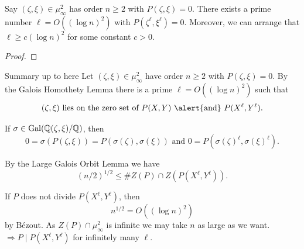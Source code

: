 \documentclass{beamer}
\begin{document}
\begin{frame}
  \begin{lemma}
    Say $(\zeta,\xi)\in \mu_\infty^2$ has order $n\ge 2$
    with $P(\zeta,\xi)=0$. There exists a prime number $\ell=O((\log
    n)^2)$ with $P(\zeta^\ell,\xi^\ell)=0$.
    Moreover, we can arrange that $\ell \ge c (\log n)^2$ for some
    constant $c>0$. 
  \end{lemma}
  \begin{proof}
    \vspace{4.5cm}

  \end{proof}
\end{frame}

\begin{frame}{Summary up to here}
  Let $(\zeta,\xi)\in \mu_\infty^2$ have order $n\ge 2$ with
  $P(\zeta,\xi)=0$. By the \alert{Galois Homothety Lemma} there
  is a prime  $\ell = O((\log n)^2)$ such that
  \begin{equation}
    (\zeta,\xi)\text{ lies on the zero set of $P(X,Y)$ \alert{and} 
      $P(X^{\ell},Y^{\ell})$}.
  \end{equation}

  If $\sigma\in \mathrm{Gal}({\mathbb{Q}}(\zeta,\xi)/{\mathbb{Q}})$, then
  $$
  0 = \sigma(P(\zeta,\xi)) = P(\sigma(\zeta),\sigma(\xi))
  \text{ and }
  0 = P(\sigma(\zeta)^\ell,\sigma(\xi)^\ell).
  $$

  By the \alert{Large Galois Orbit Lemma} we have
  $$
  (n/2)^{1/2} \le \# Z(P)\cap Z(P(X^\ell,Y^\ell)).
  $$
  
  If $P$ does not divide $P(X^\ell,Y^\ell)$,
  then 
  \begin{equation*}
    n^{1/2} = O((\log n)^2)
  \end{equation*}
  by B\'ezout.
  As $Z(P)\cap\mu_\infty^2$ is infinite  we may take $n$
  as large as we want. $\Rightarrow   P \mid P(X^\ell,Y^\ell)$ for
  infinitely many $\ell$.
\end{frame}
\end{document}
